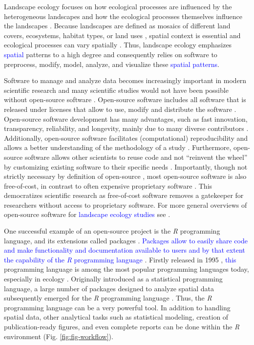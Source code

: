 \documentclass[smallextended]{svjour3}       %
\begin{document}
Landscape ecology focuses on how ecological processes are influenced by the heterogeneous landscapes and how the ecological processes themselves influence the landscapes \cite{Turner1989,Turner2005,With2019}.
Because landscapes are defined as mosaics of different land covers, ecosystems, habitat types, or land uses \cite{Forman1986,Forman1995,Wiens1995a}, spatial context is essential and ecological processes can vary spatially \cite{With2019}.
Thus, landscape ecology emphasizes \textcolor{blue}{spatial} patterns to a high degree \cite{Risser1984} and consequently relies on software to preprocess, modify, model, analyze, and visualize these \textcolor{blue}{spatial patterns}.

Software to manage and analyze data becomes increasingly important in modern scientific research \cite{Wilson2014} and many scientific studies would not have been possible without open-source software \cite{Prlic2012}.
Open-source software includes all software that is released under licenses that allow to use, modify and distribute the software \cite{St.Laurent2008}.
Open-source software development has many advantages, such as fast innovation, transparency, reliability, and longevity, mainly due to many diverse contributors \cite{vonKrogh2006,St.Laurent2008}.
Additionally, open-source software facilitates (computational) reproducibility and allows a better understanding of the methodology of a study \cite{Prlic2012,Powers2019}.
Furthermore, open-source software allows other scientists to reuse code and not ``reinvent the wheel'' \cite{Prlic2012} by customizing existing software to their specific needs \cite{Steiniger2009}.
Importantly, though not strictly necessary by definition of open-source \cite{Steiniger2009,Steiniger2009a}, most open-source software is also free-of-cost, in contrast to often expensive proprietary software \cite{vonKrogh2006,Steiniger2009,Steiniger2009a}.
This democratizes scientific research as free-of-cost software removes a gatekeeper for researchers without access to proprietary software.
For more general overviews of open-source software for \textcolor{blue}{landscape ecology studies} see \cite{Jolma2008,Steiniger2009,Steiniger2009a,Istvan2012}.

One successful example of an open-source project is the \textit{R} programming language, and its extensions called packages \cite{RCoreTeam2019}.
\textcolor{blue}{Packages allow to easily share code and make functionality and documentation available to users and by that extent the capability of the \textit{R} programming language \cite{Wickham2015}}.
Firstly released in 1995 \cite{Smith2016}, \textcolor{blue}{this} programming language is among the most popular programming languages today, especially in ecology \cite{Lai2019}.
Originally introduced as a statistical programming language, a large number of packages designed to analyze spatial data subsequently emerged for the \textit{R} programming language \cite{Bivand2006,Lovelace2019}.
Thus, the \textit{R} programming language can be a very powerful tool.
In addition to handling spatial data, other analytical tasks such as statistical modeling, creation of publication-ready figures, and even complete reports can be done within the \textit{R} environment (Fig. \ref{fig:fig-workflow}).
\end{document}
